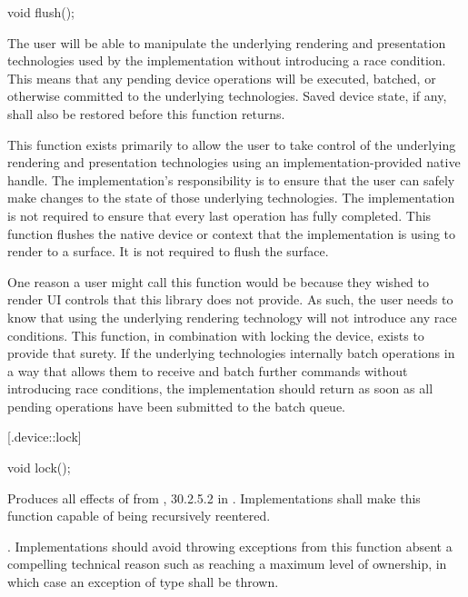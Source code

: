 %
%
\begin{itemdecl}
void flush();
\end{itemdecl}
\begin{itemdescr}
	\pnum
	\effects
	The user will be able to manipulate the underlying rendering and 
	presentation technologies used by the implementation without introducing a 
	race condition. This means that any pending device operations will be 
	executed, batched, or otherwise committed to the underlying technologies. 
	Saved device state, if any, shall also be restored before this function 
	returns.

	\pnum
	\remarks
	This function exists primarily to allow the user to take control of the 
	underlying rendering and presentation technologies using an 
	implementation-provided native handle. The implementation's responsibility 
	is to ensure that the user can safely make changes to the state of those 
	underlying technologies. The implementation is not required to ensure that 
	every last operation has fully completed.
	\enternote
	This function flushes the native device or context that the implementation 
	is using to render to a surface. It is not required to flush the surface.
	\exitnote
	
	\pnum
	\realnotes
	One reason a user might call this function would be because they wished to 
	render UI controls that this library does not provide. As such, the 
	user needs to know that using the underlying rendering technology will not 
	introduce any race conditions. This function, in combination with locking 
	the device, exists to provide that surety. If the underlying technologies 
	internally batch operations in a way that allows them to receive and batch 
	further commands without introducing race conditions, the implementation 
	should return as soon as all pending operations have been submitted to the 
	batch queue.
\end{itemdescr}

 [\iotwod.device::lock] {}

%
%
\begin{itemdecl}
void lock();
\end{itemdecl}
\begin{itemdescr}
	\pnum
	\effects
	Produces all effects of  from , 
	30.2.5.2 in \CppXIV. Implementations shall make this function capable of 
	being recursively reentered.
	
	\pnum
	\throws
	.
	\enternote
	Implementations should avoid throwing exceptions from this function absent 
	a compelling technical reason such as reaching a maximum level of 
	ownership, in which case an exception of type  
	shall be thrown.
	\exitnote
\end{itemdescr}

